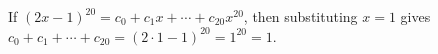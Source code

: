If $(2x-1)^{20}=c_0+c_1x+\cdots+c_{20}x^{20}$, then substituting $x=1$ gives $c_0+c_1+\cdots+c_{20}=(2\cdot1-1)^{20}=1^{20}=\boxed{1}$.
